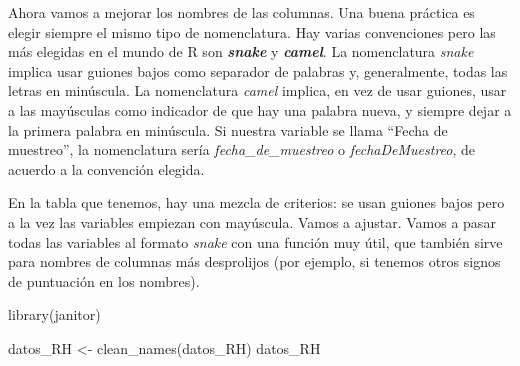 \documentclass[
]{book}
\newenvironment{Shaded}{\begin{snugshade}}{\end{snugshade}}
\newcommand{\FunctionTok}[1]{\textcolor[rgb]{0.00,0.00,0.00}{#1}}
\newcommand{\NormalTok}[1]{#1}
\newcommand{\OtherTok}[1]{\textcolor[rgb]{0.56,0.35,0.01}{#1}}
\begin{document}
Ahora vamos a mejorar los nombres de las columnas. Una buena práctica es elegir siempre el mismo tipo de nomenclatura. Hay varias convenciones pero las más elegidas en el mundo de R son \textbf{\emph{snake}} y \textbf{\emph{camel}}. La nomenclatura \emph{snake} implica usar guiones bajos como separador de palabras y, generalmente, todas las letras en minúscula. La nomenclatura \emph{camel} implica, en vez de usar guiones, usar a las mayúsculas como indicador de que hay una palabra nueva, y siempre dejar a la primera palabra en minúscula. Si nuestra variable se llama ``Fecha de muestreo'', la nomenclatura sería \emph{fecha\_de\_muestreo} o \emph{fechaDeMuestreo}, de acuerdo a la convención elegida.

En la tabla que tenemos, hay una mezcla de criterios: se usan guiones bajos pero a la vez las variables empiezan con mayúscula. Vamos a ajustar. Vamos a pasar todas las variables al formato \emph{snake} con una función muy útil, que también sirve para nombres de columnas más desprolijos (por ejemplo, si tenemos otros signos de puntuación en los nombres).

\begin{Shaded}
\begin{Highlighting}[]
\FunctionTok{library}\NormalTok{(janitor)}
\end{Highlighting}
\end{Shaded}

\begin{Shaded}
\begin{Highlighting}[]
\NormalTok{datos\_RH }\OtherTok{\textless{}{-}} \FunctionTok{clean\_names}\NormalTok{(datos\_RH)}
\NormalTok{datos\_RH }
\end{Highlighting}
\end{Shaded}
\end{document}
